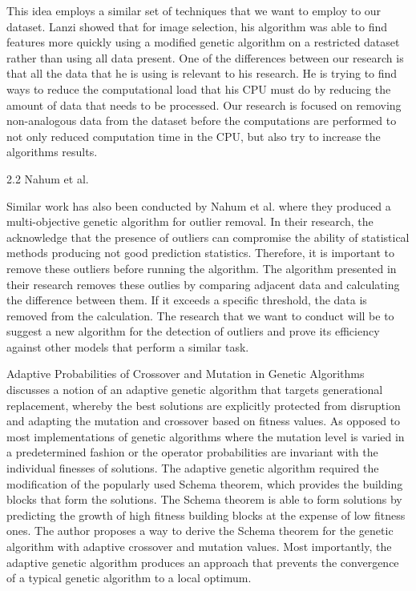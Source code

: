 \documentclass[conference]{IEEEtran}
\begin{document}
\large This idea employs a similar set of techniques that we want to employ to our dataset. Lanzi showed that for image selection, his algorithm was able to find features more quickly using a modified genetic algorithm on a restricted dataset rather than using all data present. One of the differences between our research is that all the data that he is using is relevant to his research. He is trying to find ways to reduce the computational load that his CPU must do by reducing the amount of data that needs to be processed. Our research is focused on removing non-analogous data from the dataset before the computations are performed to not only reduced computation time in the CPU, but also try to increase the algorithms results. 

2.2 Nahum et al.

\large Similar work has also been conducted by Nahum et al.  where they produced a multi-objective genetic algorithm for outlier removal. In their research, the acknowledge that the presence of outliers can compromise the ability of statistical methods producing not good prediction statistics. Therefore, it is important to remove these outliers before running the algorithm. The algorithm presented in their research removes these outlies by comparing adjacent data and calculating the difference between them. If it exceeds a specific threshold, the data is removed from the calculation. The research that we want to conduct will be to suggest a new algorithm for the detection of outliers and prove its efficiency against other models that perform a similar task. 

\large Adaptive Probabilities of Crossover and Mutation in Genetic Algorithms discusses a notion of an adaptive genetic algorithm that targets generational replacement, whereby the best solutions are explicitly protected from disruption and adapting the mutation and crossover based on fitness values. As opposed to most implementations of genetic algorithms where the mutation level is varied in a predetermined fashion or the operator probabilities are invariant with the individual finesses of solutions. The adaptive genetic algorithm required the modification of the popularly used Schema theorem, which provides the building blocks that form the solutions. The Schema theorem is able to form solutions by predicting the growth of high fitness building blocks at the expense of low fitness ones. The author proposes a way to derive the Schema theorem for the genetic algorithm with adaptive crossover and mutation values. Most importantly, the adaptive genetic algorithm produces an approach that prevents the convergence of a typical genetic algorithm to a local optimum.
\end{document}
